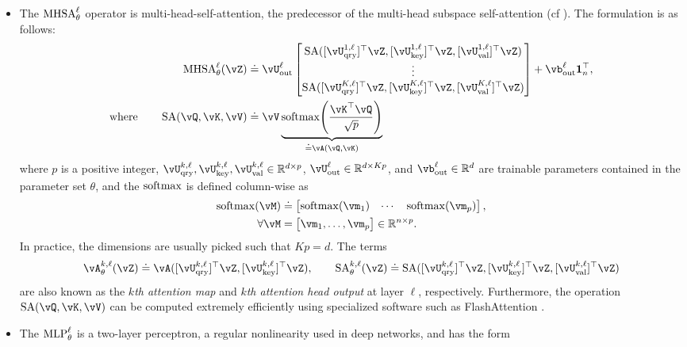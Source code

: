 \documentclass[../../book-main.tex]{subfiles}
\begin{document}
\begin{itemize}
    \item The \(\operatorname{MHSA}_{\theta}^{\ell}\) operator is multi-head-self-attention, the predecessor of the multi-head subspace self-attention (cf ). The formulation is as follows:
    \begin{align}
        \MHSA_{\theta}^{\ell}(\vZ) \label{eq:mhsa}
        &\doteq \vU_{\out}^{\ell}\mat{\SA([\vU_{\query}^{1, \ell}]^{\top}\vZ, [\vU_{\attnkey}^{1, \ell}]^{\top}\vZ, [\vU_{\val}^{1, \ell}]^{\top}\vZ) \\ \vdots \\ \SA([\vU_{\query}^{K, \ell}]^{\top}\vZ, [\vU_{\attnkey}^{K, \ell}]^{\top}\vZ, [\vU_{\val}^{K, \ell}]^{\top}\vZ)} + \vb_{\out}^{\ell}\vone_{n}^{\top}, \\
        \label{eq:self_attention}
        \text{where} \qquad \SA(\vQ, \vK, \vV)
        &\doteq \vV \underbrace{\softmax\rp{\frac{\vK^{\top}\vQ}{\sqrt{p}}}}_{\doteq \vA(\vQ, \vK)}
    \end{align}
    where \(p\) is a positive integer, \(\vU_{\query}^{k, \ell}, \vU_{\attnkey}^{k, \ell}, \vU_{\val}^{k, \ell} \in \R^{d \times p}\), \(\vU_{\out}^{\ell} \in \R^{d \times Kp}\), and \(\vb_{\out}^{\ell} \in \R^{d}\) are trainable parameters contained in the parameter set \(\theta\), and the \(\operatorname{\mathrm{softmax}}\) is defined column-wise as 
    \begin{align}
        \softmax(\vM) 
        &\doteq \mat{\softmax(\vm_{1}) & \cdots & \softmax(\vm_{p})}, \\ 
        \forall \vM 
        &= \mat{\vm_{1}, \dots, \vm_{p}} \in \R^{n \times p}.
    \end{align}
    In practice, the dimensions are usually picked such that \(Kp = d\). The terms 
    \begin{equation}
        \label{eq:attention_map}
        \vA_{\theta}^{k, \ell}(\vZ) \doteq \vA([\vU_{\query}^{k, \ell}]^{\top}\vZ, [\vU_{\attnkey}^{k, \ell}]^{\top}\vZ), \qquad \SA_{\theta}^{k, \ell}(\vZ) \doteq \SA([\vU_{\query}^{k, \ell}]^{\top}\vZ, [\vU_{\attnkey}^{k, \ell}]^{\top}\vZ, [\vU_{\val}^{k, \ell}]^{\top}\vZ)
    \end{equation}
    are also known as the \textit{\(k\)th attention map} and \textit{\(k\)th attention head output} at layer \(\ell\), respectively. Furthermore, the operation \(\SA(\vQ, \vK, \vV)\) can be computed extremely efficiently using specialized software such as FlashAttention \citep{shah2025flashattention}.
    \item The \(\operatorname{MLP}_{\theta}^{\ell}\) is a two-layer perceptron, a regular nonlinearity used in deep networks, and has the form 

\end{itemize}
\end{document}
